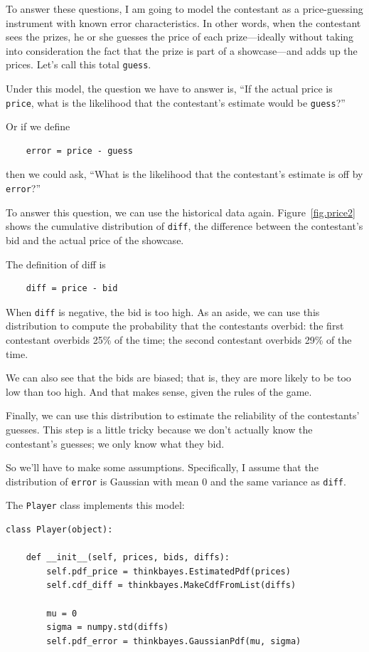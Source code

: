 \documentclass[12pt]{book}
\begin{document}
To answer these questions, I am going to model the contestant
as a price-guessing instrument with known error characteristics.
In other words, when the contestant sees the prizes, he or she
guesses the price of each prize---ideally without taking into
consideration the fact that the prize is part of a showcase---and
adds up the prices.  Let's call this total {\tt guess}.

Under this model, the question we have to answer is, ``If the
actual price is {\tt price}, what is the likelihood that the
contestant's estimate would be {\tt guess}?''

Or if we define
%
\begin{verbatim}
    error = price - guess
\end{verbatim}
%
then we could ask, ``What is the likelihood
that the contestant's estimate is off by {\tt error}?''

To answer this question, we can use the historical data again.
Figure~\ref{fig.price2} shows the cumulative distribution of {\tt diff},
the difference between the contestant's bid and the actual price
of the showcase.

The definition of diff is
%
\begin{verbatim}
    diff = price - bid
\end{verbatim}
%
When {\tt diff} is negative, the bid is too high.  As an
aside, we can use this distribution to compute the probability that the
contestants overbid: the first contestant overbids 25\% of the
time; the second contestant overbids 29\% of the time.

We can also see that the bids are biased;
that is, they are more likely to be too low than too high.  And
that makes sense, given the rules of the game.

Finally, we can use this distribution to estimate the reliability of
the contestants' guesses.  This step is a little tricky because
we don't actually know the contestant's guesses; we only know
what they bid.

So we'll have to make some assumptions.  Specifically, I
assume that the distribution of {\tt error} is Gaussian with mean 0
and the same variance as {\tt diff}.

The {\tt Player} class implements this model:

\begin{verbatim}
class Player(object):

    def __init__(self, prices, bids, diffs):
        self.pdf_price = thinkbayes.EstimatedPdf(prices)
        self.cdf_diff = thinkbayes.MakeCdfFromList(diffs)

        mu = 0
        sigma = numpy.std(diffs)
        self.pdf_error = thinkbayes.GaussianPdf(mu, sigma)
\end{verbatim}
\end{document}
